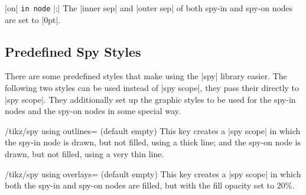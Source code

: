 \begin{command}{\spy {} |on|  \texttt{in node} |;|}
    The |inner sep| and |outer sep| of both spy-in and spy-on nodes are set to
    |0pt|.
\end{command}


\subsection{Predefined Spy Styles}

There are some predefined styles that make using the |spy| library easier. The
following two styles can be used instead of |spy scope|, they pass their
 directly to |spy scope|. They additionally set up the graphic
styles to be used for the spy-in nodes and the spy-on nodes in some special
way.

\begin{key}{/tikz/spy using outlines= (default \normalfont empty)}
    This key creates a |spy scope| in which the spy-in node is drawn, but not
    filled, using a thick line; and the spy-on node is drawn, but not filled,
    using a very thin line.
\begin{codeexample}[]
\end{codeexample}
\end{key}

\begin{key}{/tikz/spy using overlays= (default \normalfont empty)}
    This key creates a |spy scope| in which both the spy-in and spy-on nodes
    are filled, but with the fill opacity set to 20\%.
\begin{codeexample}[]
\end{codeexample}
\end{key}

